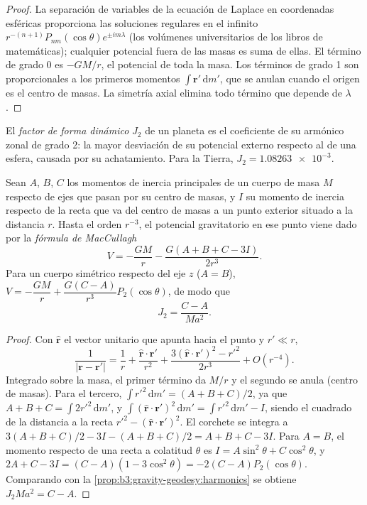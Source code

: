 \begin{proof}
La separación de variables de la ecuación de Laplace en coordenadas esféricas
proporciona las soluciones regulares en el infinito $r^{-(n+1)}P_{nm}(\cos\theta)e^{\pm
im\lambda}$ (los volúmenes universitarios de los libros de matemáticas); cualquier potencial fuera de
las masas es suma de ellas. El término de grado 0 es $-GM/r$, el potencial de
toda la masa. Los términos de grado 1 son proporcionales a los primeros momentos
$\int\mathbf r'\,\mathrm dm'$, que se anulan cuando el origen es el centro de
masas. La simetría axial elimina todo término que depende de $\lambda$.
\end{proof}

\begin{definition}\label{def:b3:gravity-geodesy:j2}
El \emph{factor de forma dinámico} $J_2$ de un planeta
es el coeficiente de su armónico zonal de grado 2: la mayor desviación de su
potencial externo respecto al de una esfera, causada por su achatamiento. Para la
Tierra, $J_2 = \num{1.08263e-3}$.
\end{definition}

\begin{theorem}\label{thm:b3:gravity-geodesy:maccullagh}
Sean $A$, $B$, $C$ los momentos de inercia principales de un cuerpo de masa $M$
respecto de ejes que pasan por su centro de masas, y $I$ su momento de inercia respecto de la
recta que va del centro de masas a un punto exterior situado a la distancia $r$. Hasta el orden
$r^{-3}$, el potencial gravitatorio en ese punto viene dado por
la \emph{fórmula de MacCullagh}
\[
  V = -\frac{GM}{r} - \frac{G(A + B + C - 3I)}{2r^3} .
\]
Para un cuerpo simétrico respecto del eje $z$ ($A = B$),
$V = -\dfrac{GM}{r} + \dfrac{G(C - A)}{r^3}P_2(\cos\theta)$, de modo que
\[
  J_2 = \frac{C - A}{Ma^2} .
\]
\end{theorem}

\begin{proof}
Con $\hat{\mathbf r}$ el vector unitario que apunta hacia el punto y $r' \ll r$,
\[
  \frac{1}{|\mathbf r - \mathbf r'|} = \frac1r + \frac{\hat{\mathbf r}\cdot\mathbf r'}{r^2}
  + \frac{3(\hat{\mathbf r}\cdot\mathbf r')^2 - r'^2}{2r^3} + O(r^{-4}).
\]
Integrado sobre la masa, el primer término da $M/r$ y el segundo se anula
(centro de masas). Para el tercero, $\int r'^2\,\mathrm dm' = (A + B + C)/2$, ya que
$A + B + C = \int 2r'^2\,\mathrm dm'$, y $\int(\hat{\mathbf r}\cdot\mathbf
r')^2\,\mathrm dm' = \int r'^2\,\mathrm dm' - I$, siendo el cuadrado de la distancia a
la recta $r'^2 - (\hat{\mathbf r}\cdot\mathbf r')^2$. El corchete se integra
a $3(A + B + C)/2 - 3I - (A + B + C)/2 = A + B + C - 3I$. Para $A = B$, el
momento respecto de una recta a colatitud $\theta$ es $I = A\sin^2\theta + C\cos^2\theta$,
y $2A + C - 3I = (C - A)(1 - 3\cos^2\theta) = -2(C - A)P_2(\cos\theta)$.
Comparando con la \cref{prop:b3:gravity-geodesy:harmonics} se obtiene
$J_2Ma^2 = C - A$.
\end{proof}


